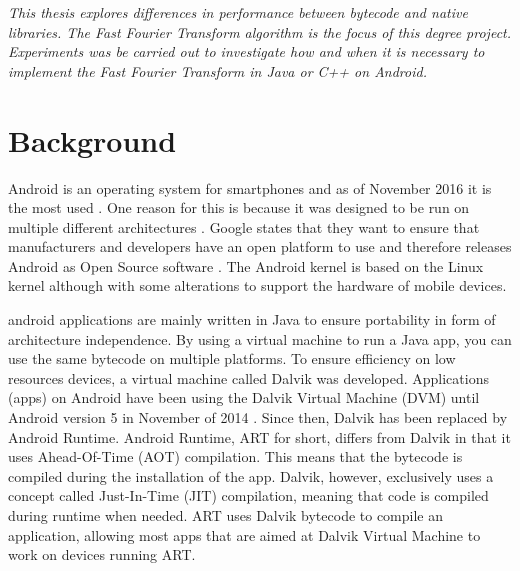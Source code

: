 
\textit{This thesis explores differences in performance between bytecode and native libraries. The Fast Fourier Transform algorithm is the focus of this degree project. Experiments was be carried out to investigate how and when it is necessary to implement the Fast Fourier Transform in Java or C++ on Android.}


\section{Background}
Android is an operating system for smartphones and as of November 2016 it is the most used \cite{android:os:popularity}. One reason for this is because it was designed to be run on multiple different architectures \cite{android:os:devices}. Google states that they want to ensure that manufacturers and developers have an open platform to use and therefore releases Android as Open Source software \cite{android:os:opensource}. The Android kernel is based on the Linux kernel although with some alterations to support the hardware of mobile devices.

\gls{android} applications are mainly written in Java to ensure portability in form of architecture independence. By using a virtual machine to run a Java app, you can use the same bytecode on multiple platforms. To ensure efficiency on low resources devices, a virtual machine called Dalvik was developed. Applications (apps) on Android have been using the Dalvik Virtual Machine (DVM) until Android version 5 \cite{android:dalvik} in November of 2014 \cite{android:dalvik:release}. Since then, Dalvik has been replaced by Android Runtime. Android Runtime, ART for short, differs from Dalvik in that it uses Ahead-Of-Time (AOT) compilation. This means that the bytecode is compiled during the installation of the app. Dalvik, however, exclusively uses a concept called Just-In-Time (JIT) compilation, meaning that code is compiled during runtime when needed. ART uses Dalvik bytecode to compile an application, allowing most apps that are aimed at Dalvik Virtual Machine to work on devices running ART.

